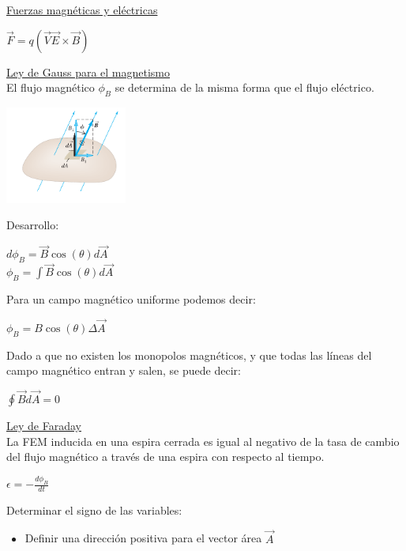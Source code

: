 \documentclass[a4paper]{article}
\begin{document}
\begin{multicols}{2}
                \underline{Fuerzas magnéticas y eléctricas} 
                    \begin{center} $\vec{F} = q(\vec{V}\vec{E} \times \vec{B})$ \end{center}
                \underline{Ley de Gauss para el magnetismo} \\[10pt]
                    \indent El flujo magnético $\phi_B$ se determina de la misma forma que el flujo eléctrico. \\
                    \begin{center} \includegraphics[width=4cm]{../imagenes/flujoCampoMagnetico.png} \end{center}
                    \indent Desarrollo:
                    \begin{center}
                        $d\phi_B = \vec{B}\cos(\theta)d\vec{A}$ \\[10pt]
                        $\phi_B = \int \vec{B}\cos(\theta)d\vec{A}$ \\[10pt]
                    \end{center}
                    \indent Para un campo magnético uniforme podemos decir:
                    \begin{center} $\phi_B = B\cos(\theta)\Delta \vec{A}$ \end{center}
                    \indent Dado a que no existen los monopolos magnéticos, y que todas las líneas del campo magnético entran y salen, se puede decir:
                    \begin{center} $\oint \vec{B} d\vec{A} = 0$ \end{center}
                \underline{Ley de Faraday} \\[10pt]
                    \indent La FEM inducida en una espira cerrada es igual al negativo de la tasa de cambio del flujo magnético a través de una espira con respecto al tiempo.
                    \begin{center} $\epsilon = - \frac{d\phi_B}{dt}$ \end{center}
                    \indent Determinar el signo de las variables:
                    \begin{itemize}
                        \item Definir una dirección positiva para el vector área $\vec{A}$

\end{itemize}
\end{multicols}
\end{document}
